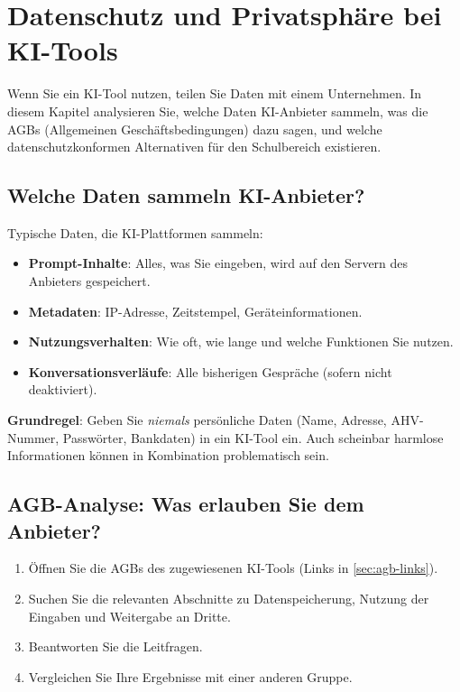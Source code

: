 \chapter{Datenschutz und Privatsphäre bei KI-Tools}\label{ch:K06_Datenschutz}

\begin{myremark}
Wenn Sie ein KI-Tool nutzen, teilen Sie Daten mit einem Unternehmen. In diesem
Kapitel analysieren Sie, welche Daten KI-Anbieter sammeln, was die AGBs
(Allgemeinen Geschäftsbedingungen) dazu sagen, und welche datenschutzkonformen
Alternativen für den Schulbereich existieren.
\end{myremark}

\section{Welche Daten sammeln KI-Anbieter?}

\begin{mysummary}
Typische Daten, die KI-Plattformen sammeln:
\begin{itemize}
    \item \textbf{Prompt-Inhalte}: Alles, was Sie eingeben, wird auf den Servern
          des Anbieters gespeichert.
    \item \textbf{Metadaten}: IP-Adresse, Zeitstempel, Geräteinformationen.
    \item \textbf{Nutzungsverhalten}: Wie oft, wie lange und welche Funktionen
          Sie nutzen.
    \item \textbf{Konversationsverläufe}: Alle bisherigen Gespräche
          (sofern nicht deaktiviert).
\end{itemize}
\end{mysummary}

\begin{myattention}
\textbf{Grundregel}: Geben Sie \emph{niemals} persönliche Daten (Name, Adresse,
AHV-Nummer, Passwörter, Bankdaten) in ein KI-Tool ein. Auch scheinbar harmlose
Informationen können in Kombination problematisch sein.
\end{myattention}

\section{AGB-Analyse: Was erlauben Sie dem Anbieter?}

\begin{myprocedure}
\begin{enumerate}
    \item Öffnen Sie die AGBs des zugewiesenen KI-Tools (Links in \cref{sec:agb-links}).
    \item Suchen Sie die relevanten Abschnitte zu Datenspeicherung, Nutzung
          der Eingaben und Weitergabe an Dritte.
    \item Beantworten Sie die Leitfragen.
    \item Vergleichen Sie Ihre Ergebnisse mit einer anderen Gruppe.
\end{enumerate}
\end{myprocedure}

